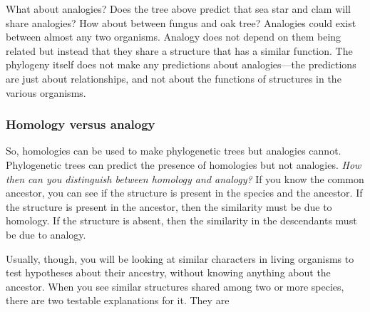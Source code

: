 \documentclass[12pt, hidelinks]{exam}
\begin{document}
\bigskip

\begin{center}


\end{center}

\bigskip

What about analogies? Does the tree above predict that sea star and clam will
share analogies? How about between fungus and oak tree? 
Analogies could exist between almost any two
organisms. Analogy does not depend on them being related but instead that they
share a structure that has a similar function. The phylogeny itself does not 
make any predictions about analogies---the predictions are just about relationships, 
and not about the functions of structures in the various organisms.

\subsubsection*{Homology versus analogy}

So, homologies can be used to make phylogenetic trees but analogies cannot. 
Phylogenetic trees can predict the presence of homologies but not analogies. 
\emph{How then can you distinguish between homology and analogy?} If you know the 
common ancestor, you can see if the structure is present in the species and the
ancestor. If the structure is present in the ancestor, then the similarity must be due
to homology. If the structure is absent, then the similarity in the descendants must be due to analogy.

Usually, though, you will be looking at similar characters in living organisms to test
hypotheses about their ancestry, without knowing anything about the ancestor.  When 
you see similar structures shared among two or more species, there are two
testable explanations for it. They are
\end{document}
